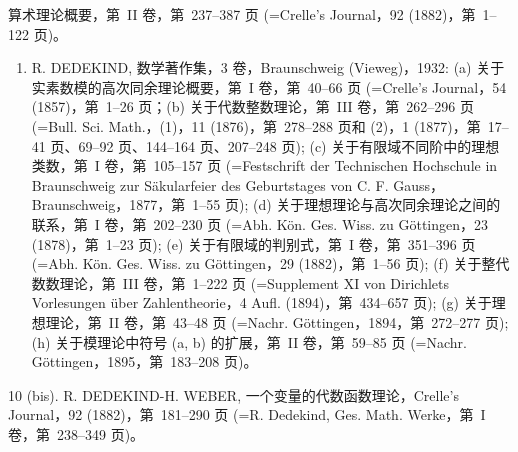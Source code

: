 算术理论概要，第~II 卷，第~237--387 页 (=Crelle's Journal，92 (1882)，第~1--122 页)。

\begin{enumerate}
\def\labelenumi{\arabic{enumi}.}
\setcounter{enumi}{9}
\tightlist
\item
  R. DEDEKIND, 数学著作集，3 卷，Braunschweig (Vieweg)，1932: (a) 关于实素数模的高次同余理论概要，第~I 卷，第~40--66 页 (=Crelle's Journal，54 (1857)，第~1--26 页；(b) 关于代数整数理论，第~III 卷，第~262--296 页 (=Bull. Sci. Math.，(1)，11 (1876)，第~278--288 页和 (2)，1 (1877)，第~17--41 页、69--92 页、144--164 页、207--248 页); (c) 关于有限域不同阶中的理想类数，第~I 卷，第~105--157 页 (=Festschrift der Technischen Hochschule in Braunschweig zur Säkularfeier des Geburtstages von C. F. Gauss，Braunschweig，1877，第~1--55 页); (d) 关于理想理论与高次同余理论之间的联系，第~I 卷，第~202--230 页 (=Abh. Kön. Ges. Wiss. zu Göttingen，23 (1878)，第~1--23 页); (e) 关于有限域的判别式，第~I 卷，第~351--396 页 (=Abh. Kön. Ges. Wiss. zu Göttingen，29 (1882)，第~1--56 页); (f) 关于整代数数理论，第~III 卷，第~1--222 页 (=Supplement XI von Dirichlets Vorlesungen über Zahlentheorie，4 Aufl. (1894)，第~434--657 页); (g) 关于理想理论，第~II 卷，第~43--48 页 (=Nachr. Göttingen，1894，第~272--277 页); (h) 关于模理论中符号 (a, b) 的扩展，第~II 卷，第~59--85 页 (=Nachr. Göttingen，1895，第~183--208 页)。
\end{enumerate}

10 (bis). R. DEDEKIND-H. WEBER, 一个变量的代数函数理论，Crelle's Journal，92 (1882)，第~181--290 页 (=R. Dedekind, Ges. Math. Werke，第~I 卷，第~238--349 页)。

